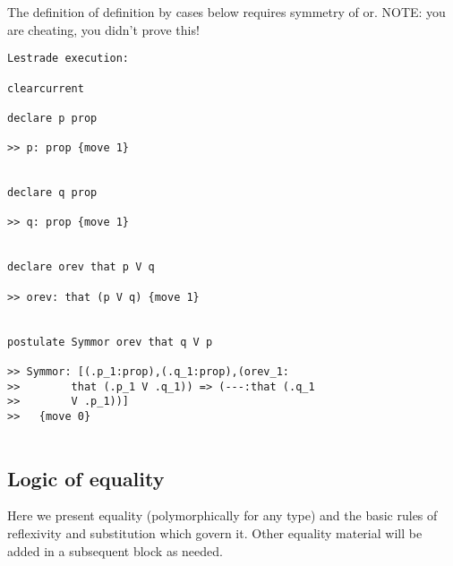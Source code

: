 \documentclass[12pt]{article}
\begin{document}
The definition of definition by cases below requires symmetry of or.  NOTE:  you are cheating, you didn't prove this!

\begin{verbatim}Lestrade execution:

clearcurrent

declare p prop

>> p: prop {move 1}


declare q prop

>> q: prop {move 1}


declare orev that p V q

>> orev: that (p V q) {move 1}


postulate Symmor orev that q V p

>> Symmor: [(.p_1:prop),(.q_1:prop),(orev_1:
>>        that (.p_1 V .q_1)) => (---:that (.q_1 
>>        V .p_1))]
>>   {move 0}


\end{verbatim}

\subsection{Logic of equality}

Here we present equality (polymorphically for any type) and the basic rules of reflexivity and substitution which govern it.  Other equality material will be
added in a subsequent block as needed.
\end{document}
